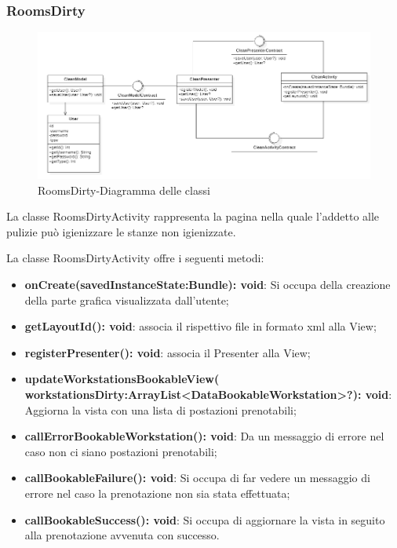 \subsubsection{RoomsDirty}
\begin{figure}[H]
	\centering
	\includegraphics[width=16cm]{res/images/Clean.png}
	\caption{RoomsDirty-Diagramma delle classi}
	\label{fig:RoomsDirty-Diagramma delle classi}
\end{figure}
La classe RoomsDirtyActivity rappresenta la pagina nella quale l'addetto alle pulizie può igienizzare le stanze non igienizzate.

La classe RoomsDirtyActivity offre i seguenti metodi:
\begin{itemize}
	\item \textbf{onCreate(savedInstanceState:Bundle): void}: Si occupa della creazione della parte grafica visualizzata dall'utente; 
	\item \textbf{getLayoutId(): void}: associa il rispettivo file in formato xml alla View;
	\item \textbf{registerPresenter(): void}: associa il Presenter alla View; 
	\item \textbf{updateWorkstationsBookableView( workstationsDirty:ArrayList<DataBookableWorkstation>?): void}: Aggiorna la vista con una lista di postazioni prenotabili; 
	\item \textbf{callErrorBookableWorkstation(): void}: Da un messaggio di errore nel caso non ci siano postazioni prenotabili;
	\item \textbf{callBookableFailure(): void}: Si occupa di far vedere un messaggio di errore nel caso la prenotazione non sia stata effettuata; 
	\item \textbf{callBookableSuccess(): void}: Si occupa di aggiornare la vista in seguito alla prenotazione avvenuta con successo.
\end{itemize}

